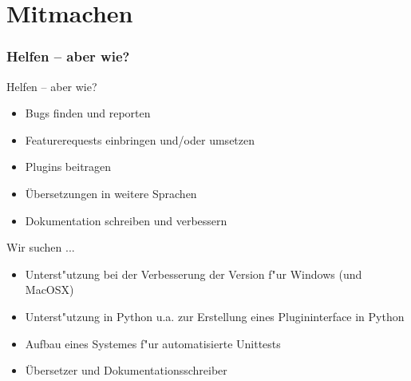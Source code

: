 \section{Mitmachen}
\begin{frame}
	\frametitle{Helfen -- aber wie?}
	\begin{block}{Helfen -- aber wie?}
		\begin{itemize}
			\item Bugs finden und reporten
			\item Featurerequests einbringen und/oder umsetzen
			\item Plugins beitragen
			\item Übersetzungen in weitere Sprachen
			\item Dokumentation schreiben und verbessern
		\end{itemize}
	\end{block}
	\pause
	\begin{block}{Wir suchen ... }
		\begin{itemize}
			\item Unterst"utzung bei der Verbesserung der Version f"ur
				  Windows (und MacOSX)
			\pause
			\item Unterst"utzung in Python u.a. zur Erstellung eines
				  Plugininterface in Python
			\pause
			\item Aufbau eines Systemes f"ur automatisierte Unittests
			\pause
			\item Übersetzer und Dokumentationsschreiber
		\end{itemize}
	\end{block}
\end{frame}
